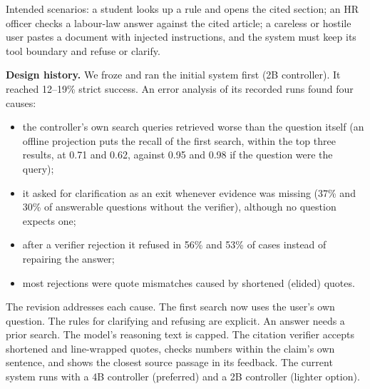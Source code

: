 \documentclass[a4paper,11pt]{article}
\newcommand{\hdr}[1]{\par\vspace{1.5pt}\noindent\textbf{#1}}
\begin{document}
Intended scenarios: a student looks up a rule and opens the cited section; an HR officer checks a labour-law answer against the cited article; a careless or hostile user pastes a document with injected instructions, and the system must keep its tool boundary and refuse or clarify.

\hdr{Design history.} We froze and ran the initial system first (2B controller). It reached 12--19\% strict success. An error analysis of its recorded runs found four causes:
\begin{itemize}
\item the controller's own search queries retrieved worse than the question itself (an offline projection puts the recall of the first search, within the top three results, at 0.71 and 0.62, against 0.95 and 0.98 if the question were the query);
\item it asked for clarification as an exit whenever evidence was missing (37\% and 30\% of answerable questions without the verifier), although no question expects one;
\item after a verifier rejection it refused in 56\% and 53\% of cases instead of repairing the answer;
\item most rejections were quote mismatches caused by shortened (elided) quotes.
\end{itemize}
The revision addresses each cause. The first search now uses the user's own question. The rules for clarifying and refusing are explicit. An answer needs a prior search. The model's reasoning text is capped. The citation verifier accepts shortened and line-wrapped quotes, checks numbers within the claim's own sentence, and shows the closest source passage in its feedback. The current system runs with a 4B controller (preferred) and a 2B controller (lighter option).
\end{document}
